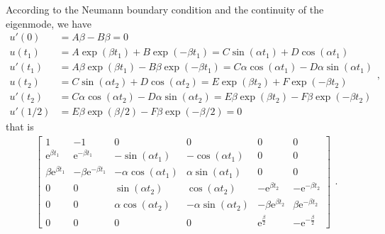 \documentclass[a4paper,11pt]{article}
\begin{document}
\begin{appendices}
According to the Neumann boundary condition and the continuity of the eigenmode, we have
\begin{equation*}
\begin{split}
u'(0) & = A \beta - B \beta = 0 \\
u(t_1) & = A \exp(\beta t_1) + B \exp(-\beta t_1) = C \sin(\alpha t_1) + D \cos(\alpha t_1) \\
u'(t_1) & = A \beta \exp(\beta t_1) - B \beta \exp(-\beta t_1) = C \alpha \cos(\alpha t_1) - D \alpha \sin(\alpha t_1) \\
u(t_2) & = C \sin(\alpha t_2) + D \cos(\alpha t_2) = E \exp(\beta t_2) + F \exp(-\beta t_2) \\
u'(t_2) & = C \alpha \cos(\alpha t_2) - D \alpha \sin(\alpha t_2) = E \beta \exp(\beta t_2) - F \beta \exp(-\beta t_2) \\
u'(1/2) & = E \beta \exp(\beta/2) - F \beta \exp(-\beta/2) = 0
\end{split},
\end{equation*}
that is
\begin{equation*}
\begin{split}
\left[\begin{array}{cccccc} 1 & -1 & 0 & 0 & 0 & 0\\ \mathrm{e}^{\beta t_1} & \mathrm{e}^{- \beta t_1} & - \sin\!\left(\alpha t_1\right) & - \cos\!\left(\alpha t_1\right) & 0 & 0\\ \beta \mathrm{e}^{\beta t_1} & - \beta \mathrm{e}^{- \beta t_1} & - \alpha \cos\!\left(\alpha t_1\right) & \alpha \sin\!\left(\alpha t_1\right) & 0 & 0\\ 0 & 0 & \sin\!\left(\alpha t_2\right) & \cos\!\left(\alpha t_2\right) & - \mathrm{e}^{\beta t_2} & - \mathrm{e}^{- \beta t_2}\\ 0 & 0 & \alpha \cos\!\left(\alpha t_2\right) & - \alpha \sin\!\left(\alpha t_2\right) & - \beta \mathrm{e}^{\beta t_2} & \beta \mathrm{e}^{- \beta t_2}\\ 0 & 0 & 0 & 0 & \mathrm{e}^{\frac{\beta}{2}} & - \mathrm{e}^{-\frac{\beta}{2}} \end{array}\right]
\end{split}.
\end{equation*}


\end{appendices}
\end{document}

